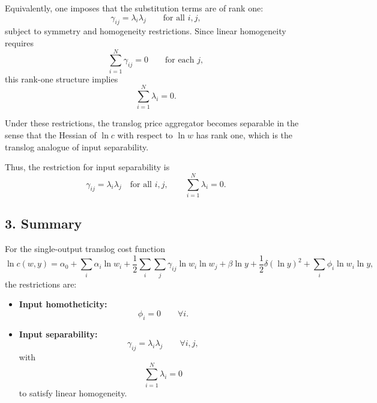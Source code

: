Equivalently, one imposes that the substitution terms are of rank one:
\[
\boxed{\gamma_{ij}=\lambda_i \lambda_j \qquad \text{for all } i,j,}
\]
subject to symmetry and homogeneity restrictions. Since linear homogeneity requires
\[
\sum_{i=1}^N \gamma_{ij}=0 \qquad \text{for each } j,
\]
this rank-one structure implies
\[
\sum_{i=1}^N \lambda_i =0.
\]

Under these restrictions, the translog price aggregator becomes separable in the sense that the Hessian of \(\ln c\) with respect to \(\ln w\) has rank one, which is the translog analogue of input separability.

Thus, the restriction for input separability is
\[
\boxed{
\gamma_{ij}=\lambda_i\lambda_j
\quad \text{for all } i,j,
\qquad
\sum_{i=1}^N \lambda_i=0.
}
\]

\subsection*{3. Summary}

For the single-output translog cost function
\[
\ln c(w,y)
=
\alpha_0
+
\sum_i \alpha_i \ln w_i
+
\frac{1}{2}\sum_i\sum_j \gamma_{ij}\ln w_i \ln w_j
+
\beta \ln y
+
\frac{1}{2}\delta (\ln y)^2
+
\sum_i \phi_i \ln w_i \ln y,
\]
the restrictions are:

\begin{itemize}
\item \textbf{Input homotheticity:}
\[
\boxed{\phi_i=0 \qquad \forall i.}
\]

\item \textbf{Input separability:}
\[
\boxed{\gamma_{ij}=\lambda_i\lambda_j \qquad \forall i,j,}
\]
with
\[
\boxed{\sum_{i=1}^N \lambda_i=0}
\]
to satisfy linear homogeneity.
\end{itemize}

